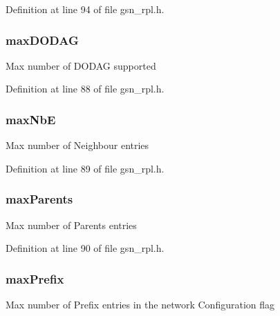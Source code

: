 Definition at line 94 of file gsn\_\-rpl.h.

\hypertarget{a00197_a5193386d8a5f326046228407c05f33a0}{
\subsubsection[{maxDODAG}]{ {\bf maxDODAG}}}
\label{a00197_a5193386d8a5f326046228407c05f33a0}
Max number of DODAG supported 

Definition at line 88 of file gsn\_\-rpl.h.

\hypertarget{a00197_aa73cd58c7ca4193dbe7db30eadec7f36}{
\subsubsection[{maxNbE}]{ {\bf maxNbE}}}
\label{a00197_aa73cd58c7ca4193dbe7db30eadec7f36}
Max number of Neighbour entries 

Definition at line 89 of file gsn\_\-rpl.h.

\hypertarget{a00197_a217c1178e6237268b2ebafe5ce2fbd50}{
\subsubsection[{maxParents}]{ {\bf maxParents}}}
\label{a00197_a217c1178e6237268b2ebafe5ce2fbd50}
Max number of Parents entries 

Definition at line 90 of file gsn\_\-rpl.h.

\hypertarget{a00197_adcb30b4d13a8bcc04b8ee94f6e554b1b}{
\subsubsection[{maxPrefix}]{ {\bf maxPrefix}}}
\label{a00197_adcb30b4d13a8bcc04b8ee94f6e554b1b}
Max number of Prefix entries in the network Configuration flag 

